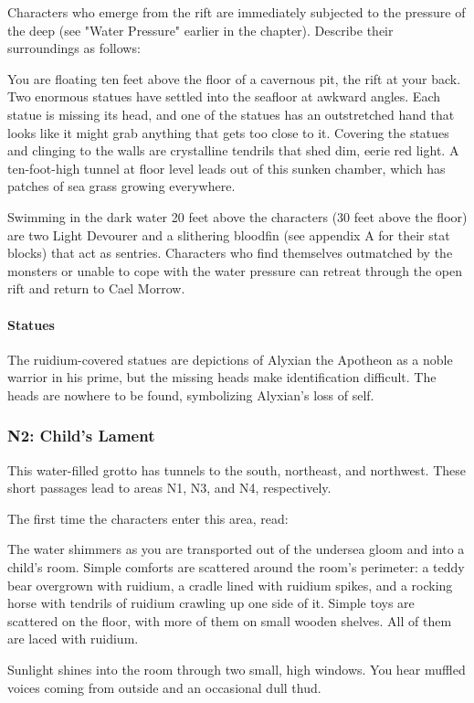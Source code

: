 \documentclass[10pt,a4paper,twoside,bg=print,twocolumn,openany,nodeprecatedcode]{dndbook}
\begin{document}
Characters who emerge from the rift are immediately subjected to the pressure of the deep (see "Water Pressure" earlier in the chapter). Describe their surroundings as follows:

\begin{DndReadAloud}{}
You are floating ten feet above the floor of a cavernous pit, the rift at your back. Two enormous statues have settled into the seafloor at awkward angles. Each statue is missing its head, and one of the statues has an outstretched hand that looks like it might grab anything that gets too close to it. Covering the statues and clinging to the walls are crystalline tendrils that shed dim, eerie red light. A ten-foot-high tunnel at floor level leads out of this sunken chamber, which has patches of sea grass growing everywhere.

\end{DndReadAloud}

Swimming in the dark water 20 feet above the characters (30 feet above the floor) are two Light Devourer and a slithering bloodfin (see appendix A for their stat blocks) that act as sentries. Characters who find themselves outmatched by the monsters or unable to cope with the water pressure can retreat through the open rift and return to Cael Morrow.

\paragraph{Statues}
The ruidium-covered statues are depictions of Alyxian the Apotheon as a noble warrior in his prime, but the missing heads make identification difficult. The heads are nowhere to be found, symbolizing Alyxian's loss of self.




\subsubsection{N2: Child's Lament}
This water-filled grotto has tunnels to the south, northeast, and northwest. These short passages lead to areas N1, N3, and N4, respectively.

The first time the characters enter this area, read:

\begin{DndReadAloud}{}
The water shimmers as you are transported out of the undersea gloom and into a child's room. Simple comforts are scattered around the room's perimeter: a teddy bear overgrown with ruidium, a cradle lined with ruidium spikes, and a rocking horse with tendrils of ruidium crawling up one side of it. Simple toys are scattered on the floor, with more of them on small wooden shelves. All of them are laced with ruidium.

Sunlight shines into the room through two small, high windows. You hear muffled voices coming from outside and an occasional dull thud.

\end{DndReadAloud}
\end{document}
